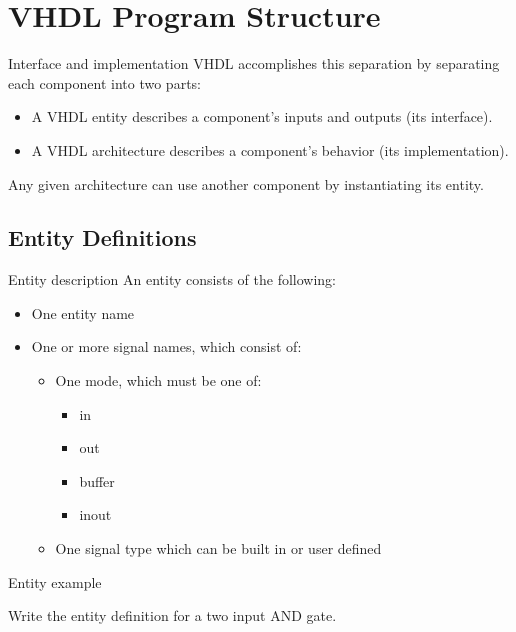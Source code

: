 \section{VHDL Program Structure}

\begin{frame}{Interface and implementation}
  VHDL accomplishes this separation by separating each component into two parts:
  \begin{itemize}
    \item A VHDL \alert{entity} describes a component's inputs and outputs (its interface).
    \item A VHDL \alert{architecture} describes a component's behavior (its implementation).
  \end{itemize}
  Any given architecture can use another component by instantiating its entity.
\end{frame}

\subsection{Entity Definitions}

\begin{frame}{Entity description}
  An entity consists of the following:
  \begin{itemize}
    \item One entity name
    \item One or more signal names, which consist of:
      \begin{itemize}
        \item One mode, which must be one of:
          \begin{itemize}
            \item in
            \item out
            \item buffer
            \item inout
          \end{itemize}
        \item One signal type which can be built in or user defined
      \end{itemize}
  \end{itemize}
\end{frame}

\begin{frame}{Entity example}
  \begin{example}
    Write the entity definition for a two input AND gate.
  \end{example}
\end{frame}

